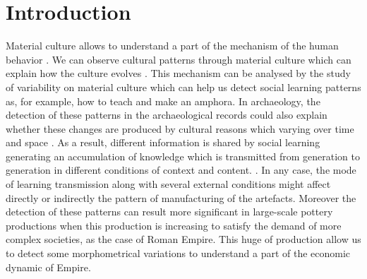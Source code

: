 \documentclass[review]{elsarticle}
\begin{document}


\section{Introduction}

Material culture allows to understand a part of the mechanism of the human behavior \citep{richerson2005not, schillinger_copying_2016}. We can observe cultural patterns through material culture which can explain how the culture evolves \citep{richerson2005not}. This mechanism can be analysed by the study of variability on material culture which can help us detect social learning patterns as, for example, how to teach and make an amphora. In archaeology, the detection of these patterns in the archaeological records could also explain whether these changes are produced by cultural reasons which varying over time and space \citep{basalla1988evolution}. As a result, different information is shared by social learning generating an accumulation of knowledge which is transmitted from generation to generation in different conditions of context and content. \citep{eerkens_jelmer_cultural_2005, neff1992ceramics,henrich_evolution_2003, boyd_cultural_2011}. In any case, the mode of learning transmission along with several external conditions might affect directly or indirectly the pattern of manufacturing of the artefacts.
Moreover the detection of these patterns can result more significant in large-scale pottery productions when this production is increasing to satisfy the demand of more complex societies, as the case of Roman Empire. This huge of production allow us to detect some morphometrical variations to understand a part of the economic dynamic of Empire. 
\end{document}
